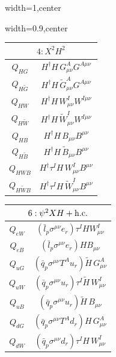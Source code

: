 \begin{table}[H]
\begin{center}
\begin{adjustbox}{width=1\textwidth,center}
\vspace{0.25cm}

\end{adjustbox}

\begin{adjustbox}{width=0.9\textwidth,center}

\begin{minipage}[t]{4.7cm}
\renewcommand{\arraystretch}{1.5}
\begin{tabular}[t]{c|c}
\multicolumn{2}{c}{\boldmath$4:X^2H^2$} \\
\hline
$Q_{H G}$     & $H^\dag H\, G^A_{\mu\nu} G^{A\mu\nu}$ \\
%
$Q_{H\widetilde G}$         & $H^\dag H\, \widetilde G^A_{\mu\nu} G^{A\mu\nu}$ \\
%
$Q_{H W}$     & $H^\dag H\, W^I_{\mu\nu} W^{I\mu\nu}$ \\
%
$Q_{H\widetilde W}$         & $H^\dag H\, \widetilde W^I_{\mu\nu} W^{I\mu\nu}$ \\
%
$Q_{H B}$     & $ H^\dag H\, B_{\mu\nu} B^{\mu\nu}$ \\
%
$Q_{H\widetilde B}$         & $H^\dag H\, \widetilde B_{\mu\nu} B^{\mu\nu}$ \\
%
$Q_{H WB}$     & $ H^\dag \tau^I H\, W^I_{\mu\nu} B^{\mu\nu}$ \\
%
$Q_{H\widetilde W B}$         & $H^\dag \tau^I H\, \widetilde W^I_{\mu\nu} B^{\mu\nu}$ 
\end{tabular}
\end{minipage}
%
%
\begin{minipage}[t]{5.2cm}
\renewcommand{\arraystretch}{1.5}
\begin{tabular}[t]{c|c}
\multicolumn{2}{c}{\boldmath$6:\psi^2 XH+\mathrm{h.c.}$} \\
\hline
$Q_{eW}$      & $(\bar l_p \sigma^{\mu\nu} e_r) \tau^I H W_{\mu\nu}^I$ \\
%
$Q_{eB}$        & $(\bar l_p \sigma^{\mu\nu} e_r) H B_{\mu\nu}$ \\
%
$Q_{uG}$        & $(\bar q_p \sigma^{\mu\nu} T^A u_r) \widetilde H \, G_{\mu\nu}^A$ \\
%
$Q_{uW}$        & $(\bar q_p \sigma^{\mu\nu} u_r) \tau^I \widetilde H \, W_{\mu\nu}^I$ \\
%
$Q_{uB}$        & $(\bar q_p \sigma^{\mu\nu} u_r) \widetilde H \, B_{\mu\nu}$ \\
%
$Q_{dG}$        & $(\bar q_p \sigma^{\mu\nu} T^A d_r) H\, G_{\mu\nu}^A$ \\
%
$Q_{dW}$         & $(\bar q_p \sigma^{\mu\nu} d_r) \tau^I H\, W_{\mu\nu}^I$ \\

\end{tabular}
\end{minipage}
\end{adjustbox}
\end{center}
\end{table}
